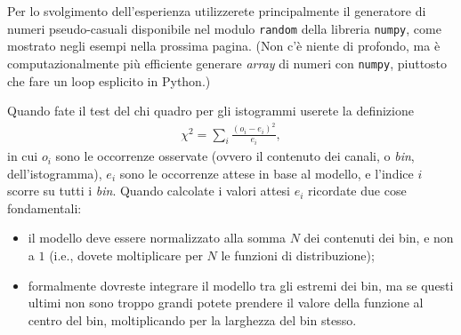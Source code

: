 \documentclass{lab1-article}
\begin{document}
\begin{article}
\secconsiderations

Per lo svolgimento dell'esperienza utilizzerete principalmente il generatore di
numeri pseudo-casuali disponibile nel modulo \texttt{random} della libreria \texttt{numpy},
come mostrato negli esempi nella prossima pagina. (Non c'\`e niente di profondo, ma
\`e computazionalmente pi\`u efficiente generare \emph{array} di numeri con
\texttt{numpy}, piuttosto che fare un loop esplicito in Python.)

Quando fate il test del chi quadro per gli istogrammi userete la definizione
\begin{align}
    \chi^2 = \sum_i \frac{(o_i - e_i)^2}{e_i},
\end{align}
in cui $o_i$ sono le occorrenze osservate (ovvero il contenuto dei canali, o \emph{bin},
dell'istogramma), $e_i$ sono le occorrenze attese in base al modello, e l'indice
$i$ scorre su tutti i \emph{bin}. Quando calcolate i valori attesi $e_i$ ricordate
due cose fondamentali:
\begin{itemize}
  \item il modello deve essere normalizzato alla somma $N$ dei contenuti
    dei bin, e non a $1$ (i.e., dovete moltiplicare per $N$ le funzioni di distribuzione);
  \item  formalmente dovreste integrare il modello tra gli estremi dei bin, ma se
    questi ultimi non sono troppo grandi potete prendere il valore della funzione
    al centro del bin, moltiplicando per la larghezza del bin stesso.
\end{itemize}


\onecolumn



\end{article}
\end{document}
